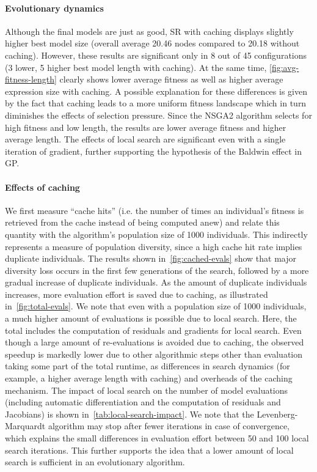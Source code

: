 \documentclass[openacc]{rstransa}%
\begin{document}
\paragraph{Evolutionary dynamics}

Although the final models are just as good, SR with caching displays slightly higher best model size (overall average 20.46 nodes compared to 20.18 without caching). However, these results are significant only in 8 out of 45 configurations (3 lower, 5 higher best model length with caching).
%
At the same time, \autoref{fig:avg-fitness-length} clearly shows lower average fitness as well as higher average expression size with caching. A possible explanation for these differences is given by the fact that caching leads to a more uniform fitness landscape which in turn diminishes the effects of selection pressure. Since the NSGA2 algorithm selects for high fitness and low length, the results are lower average fitness and higher average length.
%
The effects of local search are significant even with a single iteration of gradient, further supporting the hypothesis of the Baldwin effect in GP.

\paragraph{Effects of caching}

We first measure ``cache hits'' (i.e. the number of times an individual's fitness is retrieved from the cache instead of being computed anew) and relate this quantity with the algorithm's population size of 1000 individuals. This indirectly represents a measure of population diversity, since a high cache hit rate implies duplicate individuals. The results shown in~\autoref{fig:cached-evals} show that major diversity loss occurs in the first few generations of the search, followed by a more gradual increase of duplicate individuals. As the amount of duplicate individuals increases, more evaluation effort is saved due to caching, as illustrated in~\autoref{fig:total-evals}. We note that even with a population size of 1000 individuals, a much higher amount of evaluations is possible due to local search. Here, the total includes the computation of residuals and gradients for local search. Even though a large amount of re-evaluations is avoided due to caching, the observed speedup is markedly lower due to other algorithmic steps other than evaluation taking some part of the total runtime, as differences in search dynamics (for example, a higher average length with caching) and overheads of the caching mechanism. The impact of local search on the number of model evaluations (including automatic differentiation and the computation of residuals and Jacobians) is shown in~\autoref{tab:local-search-impact}. We note that the Levenberg-Marquardt algorithm may stop after fewer iterations in case of convergence, which explains the small differences in evaluation effort between 50 and 100 local search iterations. This further supports the idea that a lower amount of local search is sufficient in an evolutionary algorithm.
\end{document}
